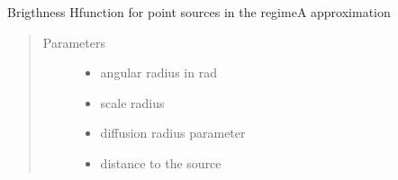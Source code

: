 \documentclass[letterpaper,10pt,english]{sphinxmanual}
\begin{document}
\begin{fulllineitems}
\label{\detokenize{diffsph.profiles:diffsph.profiles.analytics.psbrA}}
\sphinxAtStartPar
Brigthness H\sphinxhyphen{}function for point sources in the regime\sphinxhyphen{}A approximation
\begin{quote}\begin{description}
\item[{Parameters}] \leavevmode\begin{itemize}
\item {} 
\sphinxAtStartPar
{} \textendash{} angular radius in rad

\item {} 
\sphinxAtStartPar
{} \textendash{} scale radius

\item {} 
\sphinxAtStartPar
{} \textendash{} diffusion radius parameter

\item {} 
\sphinxAtStartPar
{} \textendash{} distance to the source

\end{itemize}

\end{description}\end{quote}

\end{fulllineitems}

\end{document}
